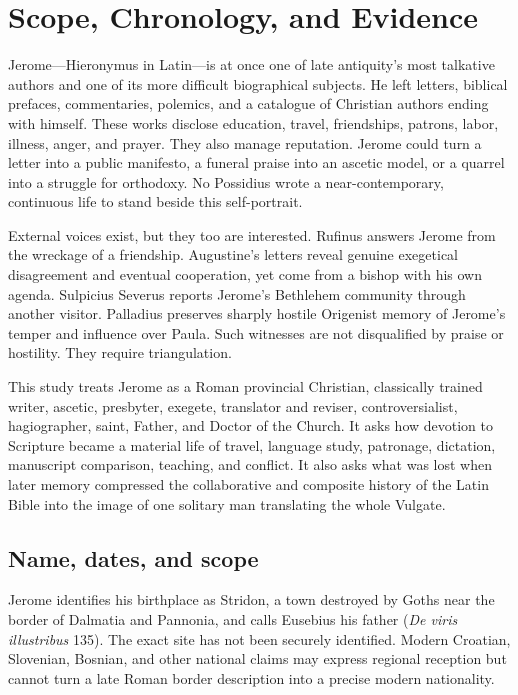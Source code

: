 \section{Scope, Chronology, and Evidence}\label{sec:jerome-method}

Jerome---Hieronymus in Latin---is at once one of late antiquity's most
talkative authors and one of its more difficult biographical subjects. He left
letters, biblical prefaces, commentaries, polemics, and a catalogue of
Christian authors ending with himself. These works disclose
education, travel, friendships, patrons, labor, illness, anger, and prayer.
They also manage reputation. Jerome could turn a letter into a public
manifesto, a funeral praise into an ascetic model, or a quarrel into a struggle
for orthodoxy. No Possidius wrote a near-contemporary, continuous life to stand
beside this self-portrait.

External voices exist, but they too are interested. Rufinus answers Jerome
from the wreckage of a friendship. Augustine's letters reveal genuine
exegetical disagreement and eventual cooperation, yet come from a bishop with
his own agenda. Sulpicius Severus reports Jerome's Bethlehem community through
another visitor. Palladius preserves sharply hostile Origenist memory of
Jerome's temper and influence over Paula. Such witnesses are not disqualified
by praise or hostility. They require triangulation.

This study treats Jerome as a Roman provincial Christian, classically trained
writer, ascetic, presbyter, exegete, translator and reviser, controversialist,
hagiographer, saint, Father, and Doctor of the Church. It asks how devotion to
Scripture became a material life of travel, language study, patronage,
dictation, manuscript comparison, teaching, and conflict. It also asks what was
lost when later memory compressed the collaborative and composite history of
the Latin Bible into the image of one solitary man translating the whole
Vulgate.

\subsection{Name, dates, and scope}

Jerome identifies his birthplace as Stridon, a town destroyed by Goths near
the border of Dalmatia and Pannonia, and calls Eusebius his father
(\emph{De viris illustribus} 135). The exact site has not been securely
identified. Modern Croatian, Slovenian, Bosnian, and other national claims may
express regional reception but cannot turn a late Roman border description
into a precise modern nationality.

